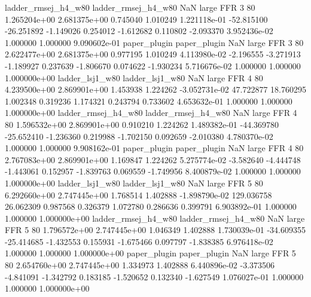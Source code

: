 ladder_rmsej_h4_w80 ladder_rmsej_h4_w80                   NaN      large      FFR                 3 80 1.265204e+00   2.681375e+00      0.745040       1.010249  1.221118e-01    -52.815100    -26.251892    -1.149026       0.254012 -1.612682   0.110802    -2.093370   3.952436e-02            1.000000        1.000000        9.090602e-01
       paper_plugin        paper_plugin                   NaN      large      FFR                 3 80 2.622477e+00   2.681375e+00      0.977195       1.010249  4.113980e-02     -2.196555     -3.271913    -1.189927       0.237639 -1.806670   0.074622    -1.930234   5.716676e-02            1.000000        1.000000        1.000000e+00
    ladder_lsj1_w80     ladder_lsj1_w80                   NaN      large      FFR                 4 80 4.239500e+00   2.869901e+00      1.453938       1.224262 -3.052731e-02     47.722877     18.760295     1.002348       0.319236  1.174321   0.243794     0.733602   4.653632e-01            1.000000        1.000000        1.000000e+00
ladder_rmsej_h4_w80 ladder_rmsej_h4_w80                   NaN      large      FFR                 4 80 1.596532e+00   2.869901e+00      0.910210       1.224262  1.489382e-01    -44.369780    -25.652410    -1.236360       0.219988 -1.702150   0.092659    -2.010380   4.780370e-02            1.000000        1.000000        9.908162e-01
       paper_plugin        paper_plugin                   NaN      large      FFR                 4 80 2.767083e+00   2.869901e+00      1.169847       1.224262  5.275774e-02     -3.582640     -4.444748    -1.443061       0.152957 -1.839763   0.069559    -1.749956   8.400879e-02            1.000000        1.000000        1.000000e+00
    ladder_lsj1_w80     ladder_lsj1_w80                   NaN      large      FFR                 5 80 6.292660e+00   2.747445e+00      1.768514       1.402888 -1.898790e-02    129.036758     26.062309     0.987568       0.326379  1.072780   0.286636     0.399791   6.903892e-01            1.000000        1.000000        1.000000e+00
ladder_rmsej_h4_w80 ladder_rmsej_h4_w80                   NaN      large      FFR                 5 80 1.796572e+00   2.747445e+00      1.046349       1.402888  1.730039e-01    -34.609355    -25.414685    -1.432553       0.155931 -1.675466   0.097797    -1.838385   6.976418e-02            1.000000        1.000000        1.000000e+00
       paper_plugin        paper_plugin                   NaN      large      FFR                 5 80 2.654760e+00   2.747445e+00      1.334973       1.402888  6.440896e-02     -3.373506     -4.841091    -1.342792       0.183185 -1.520652   0.132340    -1.627549   1.076027e-01            1.000000        1.000000        1.000000e+00
